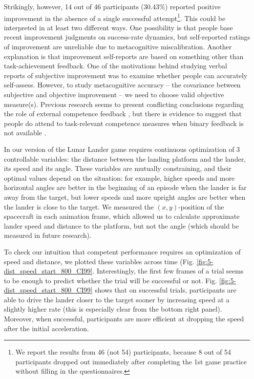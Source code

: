 Strikingly, however, 14 out of 46 participants ($30.43\%$) reported positive improvement in the absence of a single successful attempt\footnote{We report the results from 46 (not 54) participants, because 8 out of 54 participants dropped out immediately after completing the 1st game practice without filling in the questionnaires.}. This could be interpreted in at least two different ways. One possibility is that people base recent improvement judgments on success-rate dynamics, but self-reported ratings of improvement are unreliable due to metacognitive miscalibration. Another explanation is that improvement self-reports are based on something other than task-achievement feedback. One of the motivations behind studying verbal reports of subjective improvement was to examine whether people can accurately self-assess. However, to study metacognitive accuracy -- the covariance between subjective and objective improvement -- we need to choose valid objective measure(s). Previous research seems to present conflicting conclusions regarding the role of external competence feedback \cite[e.g.,][]{townsend_judgments_2011,leonard_young_2021}, but there is evidence to suggest that people do attend to task-relevant competence measures when binary feedback is not available \cite{locke_performance_2020}.

In our version of the Lunar Lander game requires continuous optimization of 3 controllable variables: the distance between the landing platform and the lander, its speed and its angle. These variables are mutually constraining, and their optimal values depend on the situation: for example, higher speeds and more horizontal angles are better in the beginning of an episode when the lander is far away from the target, but lower speeds and more upright angles are better when the lander is close to the target. We measured the $(x,y)$-position of the spacecraft in each animation frame, which allowed us to calculate approximate lander speed and distance to the platform, but not the angle  (which should be measured in future research).

To check our intuition that competent performance requires an optimization of speed and distance, we plotted these variables across time (Fig. \ref{fig:5-dist_speed_start_800_CI99}. Interestingly, the first few frames of a trial seems to be enough to predict whether the trial will be successful or not. Fig. \ref{fig:5-dist_speed_start_800_CI99} shows that on successful trials, participants are able to drive the lander closer to the target sooner by increasing speed at a slightly higher rate (this is especially clear from the bottom right panel). Moreover, when successful, participants are more efficient at dropping the speed after the initial acceleration.

